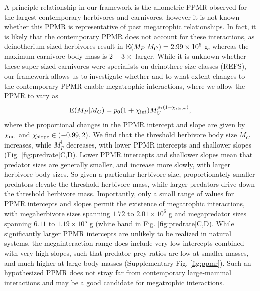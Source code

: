\documentclass[11pt]{article}
\begin{document}
A principle relationship in our framework is the allometric PPMR observed for the largest contemporary herbivores and carnivores, however it is not known whether this PPMR is representative of past megatrophic relationships.
In fact, it is likely that the contemporary PPMR does not account for these interactions, as deinotherium-sized herbivores result in ${\rm E}(M_P|M_C)=2.99\times10^5$ g, whereas the maximum carnivore body mass is $2-3\times$ larger.
While it is unknown whether these super-sized carnivores were specialists on deinothere size-classes (REFS), our framework allows us to investigate whether and to what extent changes to the contemporary PPMR enable megatrophic interactions, where we allow the PPMR to vary as 
\begin{equation}
{\rm E}(M_P|M_C) = p_0(1+\chi_{\rm int}) M_C^{p_1(1+\chi_{\rm slope})},
\label{eq:ppmr}
\end{equation}
where the proportional changes in the PPMR intercept and slope are given by $\chi_{\rm int}$ and $\chi_{\rm slope} \in (-0.99,2)$.
We find that the threshold herbivore body size $M_C^\dagger$ increases, while $M_P^\dagger$ decreases, with lower PPMR intercepts and shallower slopes (Fig. \ref{fig:predrate}C,D). %
Lower PPMR intercepts and shallower slopes mean that predator sizes are generally smaller, and increase more slowly, with larger herbivore body sizes.
So given a particular herbivore size, proportionately smaller predators elevate the threshold herbivore mass, while larger predators drive down the threshold herbivore mass.
Importantly, only a small range of values for PPMR intercepts and slopes permit the existence of megatrophic interactions, with megaherbivore sizes spanning $1.72$ to $2.01\times10^6$ g and megapredator sizes spanning $6.11$ to $1.19\times10^5$ g (white band in Fig. \ref{fig:predrate}C,D).
While significantly larger PPMR intercepts are unlikely to be realized in natural systems, the megainteraction range does include very low intercepts combined with very high slopes, such that predator-prey ratios are low at smaller masses, and much higher at large body masses (Supplementary Fig. \ref{fig:ppmr}).
Such an hypothesized PPMR does not stray far from contemporary large-mammal interactions and may be a good candidate for megatrophic interactions. 
\end{document}
